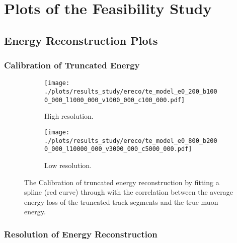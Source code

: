 \chapter{Plots of the Feasibility Study}

\section{Energy Reconstruction Plots}

\subsection{Calibration of Truncated Energy} \label{sec:study_ereco_calib}

\begin{figure}[H]
    \centering
    \begin{subfigure}{0.7\textwidth}
        \centering
        \texttt{[image: ./plots/results\_study/ereco/te\_model\_e0\_200\_b1000\_000\_l1000\_000\_v1000\_000\_c100\_000.pdf]}
        \caption{High resolution.}
        \label{fig:study_ereco_trunc_calib_high}
    \end{subfigure}
    \begin{subfigure}{0.7\textwidth}
        \vspace{0.5cm}
        \centering
        \texttt{[image: ./plots/results\_study/ereco/te\_model\_e0\_800\_b2000\_000\_l10000\_000\_v3000\_000\_c5000\_000.pdf]}
        \caption{Low resolution.}
        \label{fig:study_ereco_trunc_calib_low}
    \end{subfigure}
    \caption{The Calibration of truncated energy reconstruction by fitting a spline (red curve) through with the correlation between the average energy loss of the truncated track segments and the true muon energy.}
    \label{fig:study_ereco_trunc_calib}
\end{figure}

%

\subsection{Resolution of Energy Reconstruction} \label{sec:study_ereco_perform_all}

